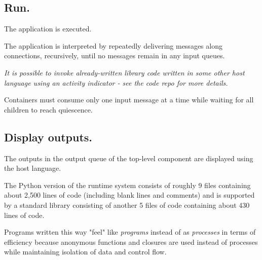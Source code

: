 \documentclass[10pt,anonymous,review]{acmart}
\begin{document}
\subsection{Run.}
The application is executed.

The application is interpreted by repeatedly delivering messages along
connections, recursively, until no messages remain in any input queues.

\emph{It is possible to invoke already-written library code written in some other host language using an activity indicator - see the code repo for more details.}

Containers must consume only one input message at a time while waiting
for all children to reach quiescence.
%
  
\subsection{Display outputs.}

The outputs in the output queue of the top-level component are displayed
using the host language.
%
  

The Python version of the runtime system consists of roughly 9 files containing
about 2,500 lines of code (including blank lines and
comments) and is supported by a standard library consisting of another 5
files of code containing about 430 lines of code.

Programs written this way "feel" like
\emph{programs} instead of as \emph{processes} in terms of efficiency because anonymous functions and closures are used instead of processes 
while maintaining isolation of data and control flow.
\end{document}
